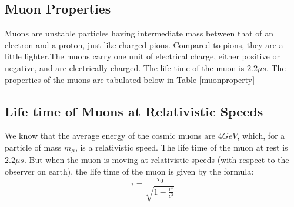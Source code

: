 \documentclass{article}
\begin{document}
\begin{multicols}{2}
\subsection{Muon Properties}

Muons are unstable particles having intermediate mass between that of an 
electron and a proton, just like charged pions. Compared to pions, they are 
a little lighter.The muons carry one unit of electrical charge, either positive 
or negative, and are electrically charged. The life time of the muon is $2.2\mu s$.
The properties of the muons are tabulated below in Table-\ref{muonproperty}

\begin{table}[H]
    \centering
    \caption{Properties of Muons}
    \label{muonproperty}
\end{table}



\subsection{Life time of Muons at Relativistic Speeds}

We know that the average energy of the cosmic muons are $4GeV$, which, for a particle of mass $m_{\mu}$, is a relativistic speed. The life time of the muon at rest is $2.2\mu s$. But when the muon is moving at relativistic speeds (with respect to the observer on earth), the life time of the muon is given by the formula:
\begin{equation}
    \tau = \frac{\tau_{0}}{\sqrt{1-\frac{v^2}{c^2}}}
\end{equation}


\end{multicols}
\end{document}
